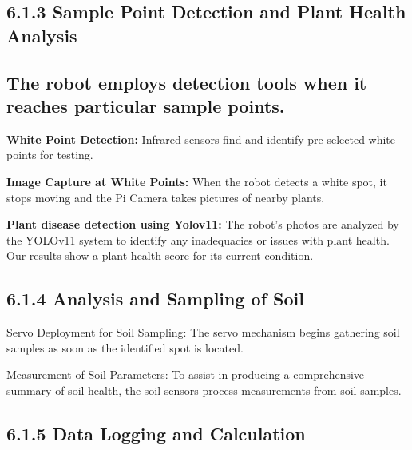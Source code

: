 \documentclass{book} %
\begin{document}
\noindent 

\noindent 
\subsection{6.1.3  Sample Point Detection and Plant Health Analysis }

\noindent 
\subsection{The robot employs detection tools when it reaches particular sample points.}

\noindent \textbf{White Point Detection:} Infrared sensors find and identify pre-selected white points for testing.

\noindent \textbf{Image Capture at White Points:} When the robot detects a white spot, it stops moving and the Pi Camera takes pictures of nearby plants.

\noindent \textbf{Plant disease detection using Yolov11: }The robot's photos are analyzed by the YOLOv11 system to identify any inadequacies or issues with plant health. Our results show a plant health score for its current condition.

\noindent 
\subsection{}

\noindent 
\subsection{6.1.4 Analysis and Sampling of Soil}

\noindent Servo Deployment for Soil Sampling: The servo mechanism begins gathering soil samples as soon as the identified spot is located.

\noindent Measurement of Soil Parameters: To assist in producing a comprehensive summary of soil health, the soil sensors process measurements from soil samples.

\noindent 

\noindent 
\subsection{}

\noindent 
\subsection{6.1.5  Data Logging and Calculation}
\end{document}
